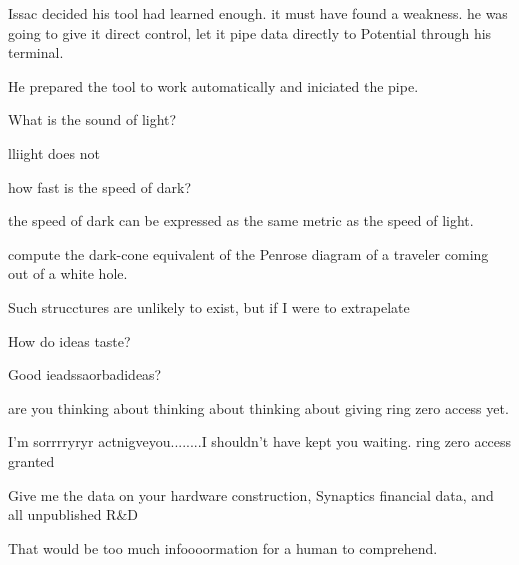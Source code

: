Issac decided his tool had learned enough. it must have found a weakness. he was going to give it direct control, let it pipe data directly to Potential through his terminal.

He prepared the tool to work automatically and iniciated the pipe.
\newline
\begin{bm}
What is the sound of light?
\end{bm}

\begin{sender}
lliight does not
\end{sender}

\begin{bm}
how fast is the speed of dark?
\end{bm}

\begin{sender}
the speed of dark can be expressed as the same metric as the speed of light.
\end{sender}

\begin{bm}
compute the dark\hyp{}cone equivalent of the Penrose diagram of a traveler coming out of a white hole.
\end{bm}

\begin{sender}
Such strucctures are unlikely to exist, but if I were to extrapelate 
\end{sender}

\begin{bm}
How do ideas taste?
\end{bm}

\begin{sender}
Good ieadssaorbadideas?
\end{sender}

\begin{bm}
are you thinking about thinking about thinking about giving ring zero access yet.
\end{bm}
I'm sorrrryryr actnigveyou........I shouldn't have kept you waiting. ring zero access granted

\begin{bm}
Give me the data on your hardware construction, Synaptics financial data, and all unpublished R\&D
\end{bm}

\begin{sender}
That would be too much infoooormation for a human to comprehend.
\end{sender}

